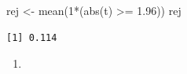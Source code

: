 \documentclass[
  letterpaper,
  DIV=11,
  numbers=noendperiod]{scrreprt}
\newenvironment{Shaded}{\begin{snugshade}}{\end{snugshade}}
\newcommand{\DecValTok}[1]{\textcolor[rgb]{0.68,0.00,0.00}{#1}}
\newcommand{\FloatTok}[1]{\textcolor[rgb]{0.68,0.00,0.00}{#1}}
\newcommand{\FunctionTok}[1]{\textcolor[rgb]{0.28,0.35,0.67}{#1}}
\newcommand{\NormalTok}[1]{\textcolor[rgb]{0.00,0.23,0.31}{#1}}
\newcommand{\OtherTok}[1]{\textcolor[rgb]{0.00,0.23,0.31}{#1}}
\newcommand{\SpecialCharTok}[1]{\textcolor[rgb]{0.37,0.37,0.37}{#1}}
\providecommand{\tightlist}{%
  \setlength{\itemsep}{0pt}\setlength{\parskip}{0pt}}\usepackage{longtable,booktabs,array}
\begin{document}
\begin{Shaded}
\begin{Highlighting}[]
\NormalTok{rej }\OtherTok{\textless{}{-}} \FunctionTok{mean}\NormalTok{(}\DecValTok{1}\SpecialCharTok{*}\NormalTok{(}\FunctionTok{abs}\NormalTok{(t) }\SpecialCharTok{\textgreater{}=} \FloatTok{1.96}\NormalTok{))}
\NormalTok{rej}
\end{Highlighting}
\end{Shaded}

\begin{verbatim}
[1] 0.114
\end{verbatim}

\begin{enumerate}
\def\labelenumi{\arabic{enumi}.}
\setcounter{enumi}{3}
\tightlist
\item
\end{enumerate}
\end{document}
